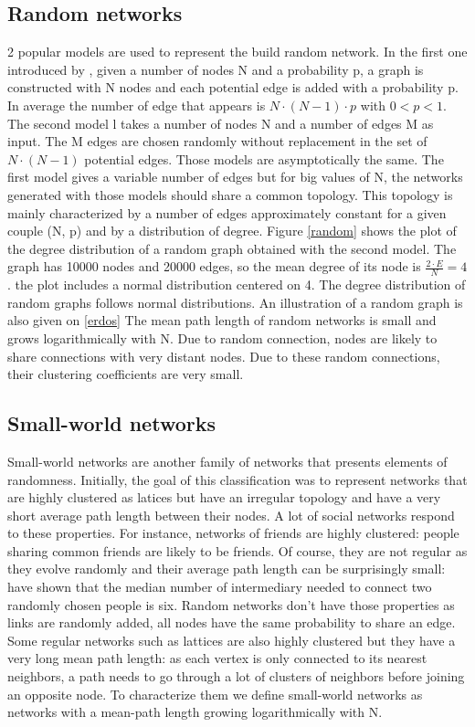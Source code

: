 \documentclass[a4paper, 12pt]{report}
\begin{document}
\subsection{Random networks}
\label{random-section}
2 popular models are used to represent the build random network. In the first one introduced by \cite{erdosRandom}, given a number of nodes N and a probability p, a graph is constructed with N nodes and each potential edge is added with a probability p. In average the number of edge that appears is $N \cdot (N-1) \cdot p$ with $ 0< p <1$. The second model \citep{gilbertRandom} l takes a number of nodes N and a number of edges M as input. The M edges are chosen randomly without replacement in the set of $N \cdot (N-1)$ potential edges. Those models are asymptotically the same. The first model gives a variable number of edges but for big values of N, the networks generated with those models should share a common topology. This topology is mainly characterized by a number of edges approximately constant for a given couple (N, p) and by a distribution of degree. Figure \ref{random} shows the plot of the degree distribution of a random graph obtained with the second model. The graph has 10000 nodes and 20000 edges, so the mean degree of its node is $\frac{2 \cdot E}{N} = 4$. the plot includes a normal distribution centered on 4. The degree distribution of random graphs follows normal distributions. An illustration of a random graph is also given on \ref{erdos} The mean path length of random networks is small and grows logarithmically with N. Due to random connection, nodes are likely to share connections with very distant nodes. Due to these random connections, their clustering coefficients are very small.\\

\subsection{Small-world networks}
\label{sm-section}
Small-world networks are another family of networks that presents elements of randomness. Initially, the goal of this classification was to represent networks that are highly clustered as latices but have an irregular topology and have a very short average path length between their nodes. A lot of social networks respond to these properties. For instance, networks of friends are highly clustered: people sharing common friends are likely to be friends. Of course, they are not regular as they evolve randomly and their average path length can be surprisingly small: \cite{milgram} have shown that the median number of intermediary needed to connect two randomly chosen people is six. Random networks don't have those properties as links are randomly added, all nodes have the same probability to share an edge. Some regular networks such as lattices are also highly clustered but they have a very long mean path length: as each vertex is only connected to its nearest neighbors, a path needs to go through a lot of clusters of neighbors before joining an opposite node. To characterize them we define small-world networks as networks with a mean-path length growing logarithmically with N. \citep{small-world, complex_networks} \\
\end{document}
